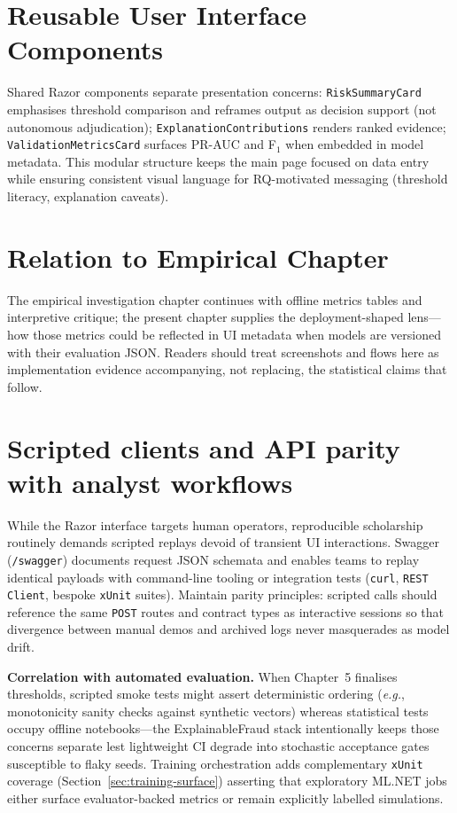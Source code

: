 \section{Reusable User Interface Components}
Shared Razor components separate presentation concerns: \texttt{RiskSummaryCard} emphasises threshold comparison and reframes output as decision support (not autonomous adjudication); \texttt{Explanation\allowbreak Contributions} renders ranked evidence; \texttt{Validation\allowbreak MetricsCard} surfaces PR-AUC and F$_1$ when embedded in model metadata. This modular structure keeps the main page focused on data entry while ensuring consistent visual language for RQ-motivated messaging (threshold literacy, explanation caveats).

\section{Relation to Empirical Chapter}
The empirical investigation chapter continues with offline metrics tables and interpretive critique; the present chapter supplies the deployment-shaped lens---how those metrics could be reflected in UI metadata when models are versioned with their evaluation JSON. Readers should treat screenshots and flows here as implementation evidence accompanying, not replacing, the statistical claims that follow.

\section{Scripted clients and API parity with analyst workflows}
While the Razor interface targets human operators, reproducible scholarship routinely demands scripted replays devoid of transient UI interactions. Swagger (\texttt{/swagger}) documents request JSON schemata and enables teams to replay identical payloads with command-line tooling or integration tests (\texttt{curl}, \texttt{REST Client}, bespoke \texttt{xUnit} suites). Maintain parity principles: scripted calls should reference the same \texttt{POST} routes and contract types as interactive sessions so that divergence between manual demos and archived logs never masquerades as model drift.

\textbf{Correlation with automated evaluation.} When Chapter~5 finalises thresholds, scripted smoke tests might assert deterministic ordering (\emph{e.g.}, monotonicity sanity checks against synthetic vectors) whereas statistical tests occupy offline notebooks---the ExplainableFraud stack intentionally keeps those concerns separate lest lightweight CI degrade into stochastic acceptance gates susceptible to flaky seeds. Training orchestration adds complementary \texttt{xUnit} coverage (Section~\ref{sec:training-surface}) asserting that exploratory ML.NET jobs either surface evaluator-backed metrics or remain explicitly labelled simulations.

